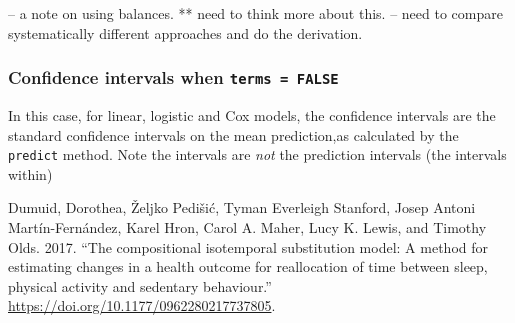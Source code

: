 \documentclass[
]{article}
\begin{document}
-- a note on using balances. ** need to think more about this. -- need
to compare systematically different approaches and do the derivation.

\hypertarget{confidence-intervals-when-terms-false}{%
\subsubsection{\texorpdfstring{Confidence intervals when
\texttt{terms\ =\ FALSE}}{Confidence intervals when terms = FALSE}}\label{confidence-intervals-when-terms-false}}

In this case, for linear, logistic and Cox models, the confidence
intervals are the standard confidence intervals on the mean
prediction,as calculated by the \texttt{predict} method. Note the
intervals are \emph{not} the prediction intervals (the intervals within)

\hypertarget{refs}{}
\leavevmode\hypertarget{ref-Dumuid2017c}{}%
Dumuid, Dorothea, Željko Pedišić, Tyman Everleigh Stanford, Josep Antoni
Martín-Fernández, Karel Hron, Carol A. Maher, Lucy K. Lewis, and Timothy
Olds. 2017. ``The compositional isotemporal substitution model: A method
for estimating changes in a health outcome for reallocation of time
between sleep, physical activity and sedentary behaviour.''
\url{https://doi.org/10.1177/0962280217737805}.
\end{document}
